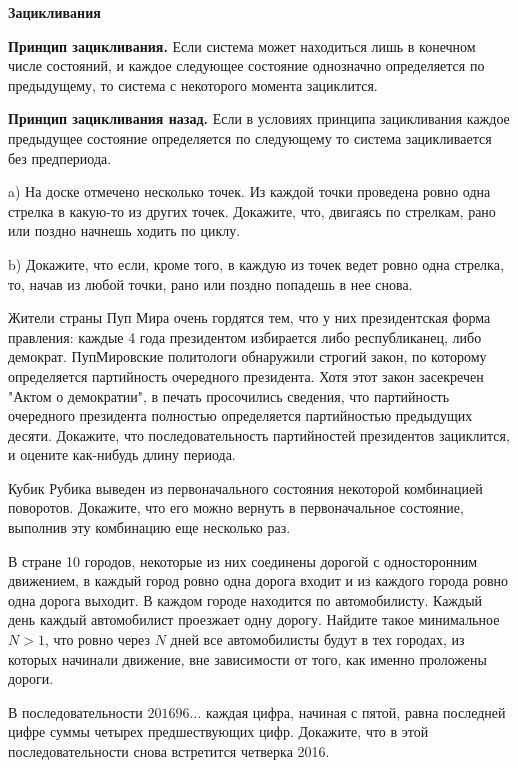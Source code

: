 \centerline{\bf \Huge Зацикливания}

\textbf{Принцип зацикливания.} Если система может находиться лишь в конечном числе состояний, и каждое следующее состояние однозначно определяется по предыдущему, то система с некоторого момента зациклится.

\textbf{Принцип зацикливания назад.} Если в условиях принципа зацикливания каждое предыдущее состояние определяется по следующему то система зацикливается без предпериода.



a) На доске отмечено несколько точек. Из каждой точки проведена ровно одна стрелка в какую-то из других точек. Докажите, что, двигаясь по стрелкам, рано или поздно начнешь ходить по циклу.

\noindent
b) Докажите, что если, кроме того, в каждую из точек ведет ровно одна стрелка, то, начав из любой точки, рано или поздно попадешь в нее снова.

Жители страны Пуп Мира очень гордятся тем, что у них президентская форма правления: каждые 4 года президентом избирается либо республиканец, либо демократ. ПупМировские политологи обнаружили строгий закон, по которому определяется партийность очередного президента. Хотя этот закон засекречен "Актом о демократии", в печать просочились сведения, что партийность очередного президента полностью определяется партийностью предыдущих десяти. Докажите, что последовательность партийностей президентов зациклится, и оцените как-нибудь длину периода.

Кубик Рубика выведен из первоначального состояния некоторой комбинацией поворотов. Докажите, что его можно вернуть в первоначальное состояние, выполнив эту комбинацию еще несколько раз.

В стране 10 городов, некоторые из них соединены дорогой с односторонним движением, в каждый город ровно одна дорога входит и из каждого города ровно одна дорога выходит. В каждом городе находится по автомобилисту. Каждый день каждый автомобилист проезжает одну дорогу. Найдите такое минимальное $N>1$, что ровно через $N$ дней все автомобилисты будут в тех городах, из которых начинали движение, вне зависимости от того, как именно проложены дороги.

В последовательности $201696 \ldots$ каждая цифра, начиная с пятой, равна последней цифре суммы четырех предшествующих цифр. Докажите, что в этой последовательности снова встретится четверка 2016.


